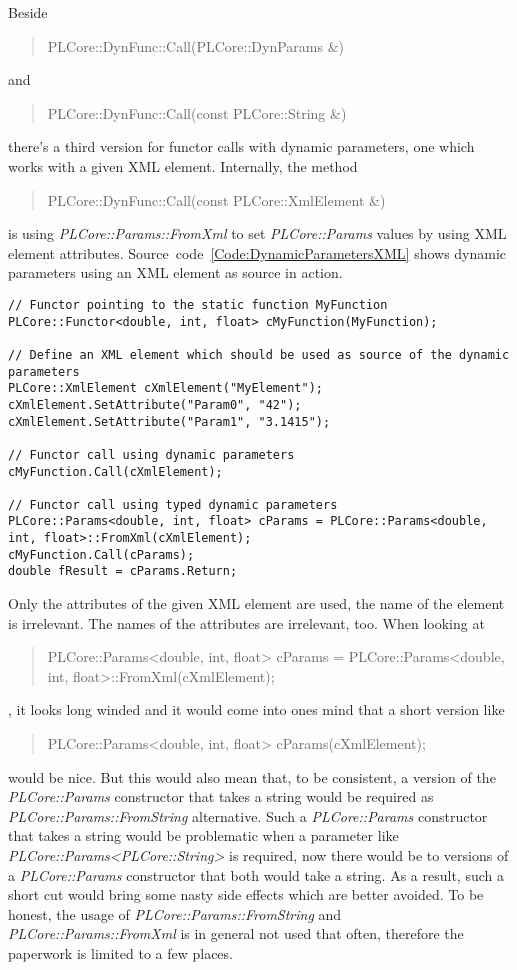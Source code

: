 Beside \begin{quote}PLCore::DynFunc::Call(PLCore::DynParams \&)\end{quote} and \begin{quote}PLCore::DynFunc::Call(const PLCore::String \&)\end{quote} there's a third version for functor calls with dynamic parameters, one which works with a given \ac{XML} element. Internally, the method \begin{quote}PLCore::DynFunc::Call(const PLCore::XmlElement \&)\end{quote} is using \emph{PLCore::Params::FromXml} to set \emph{PLCore::Params} values by using \ac{XML} element attributes. Source~code~\ref{Code:DynamicParametersXML} shows dynamic parameters using an \ac{XML} element as source in action.
\begin{lstlisting}[label=Code:DynamicParametersXML,caption={Dynamic parameters using an \ac{XML} element as source}]
// Functor pointing to the static function MyFunction
PLCore::Functor<double, int, float> cMyFunction(MyFunction);

// Define an XML element which should be used as source of the dynamic parameters
PLCore::XmlElement cXmlElement("MyElement");
cXmlElement.SetAttribute("Param0", "42");
cXmlElement.SetAttribute("Param1", "3.1415");

// Functor call using dynamic parameters
cMyFunction.Call(cXmlElement);

// Functor call using typed dynamic parameters
PLCore::Params<double, int, float> cParams = PLCore::Params<double, int, float>::FromXml(cXmlElement);
cMyFunction.Call(cParams);
double fResult = cParams.Return;
\end{lstlisting}
Only the attributes of the given \ac{XML} element are used, the name of the element is irrelevant. The names of the attributes are irrelevant, too. When looking at \begin{quote}PLCore::Params<double, int, float> cParams = PLCore::Params<double, int, float>::FromXml(cXmlElement);\end{quote}, it looks long winded and it would come into ones mind that a short version like \begin{quote}PLCore::Params<double, int, float> cParams(cXmlElement);\end{quote} would be nice. But this would also mean that, to be consistent, a version of the \emph{PLCore::Params} constructor that takes a string would be required as \emph{PLCore::Params::FromString} alternative. Such a \emph{PLCore::Params} constructor that takes a string would be problematic when a parameter like \emph{PLCore::Params<PLCore::String>} is required, now there would be to versions of a \emph{PLCore::Params} constructor that both would take a string. As a result, such a short cut would bring some nasty side effects which are better avoided. To be honest, the usage of \emph{PLCore::Params::FromString} and \emph{PLCore::Params::FromXml} is in general not used that often, therefore the paperwork is limited to a few places.




